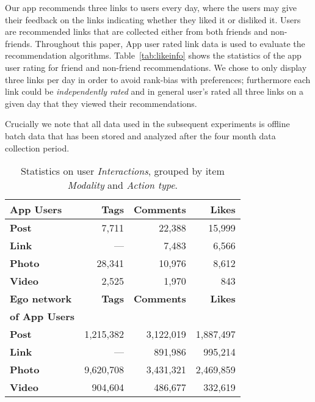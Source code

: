 Our app recommends three links to users every day, where the users may give
their feedback on the links indicating whether they liked it or
disliked it. Users are recommended links that are collected either
from both friends and non-friends. Throughout this paper, App user rated
link data is used to evaluate the recommendation algorithms.
Table~\ref{tab:likeinfo} shows the statistics of the app user rating
for friend and non-friend recommendations.  We chose to only display
three links per day in order to avoid rank-bias with preferences;
furthermore each link could be \emph{independently rated} and in general
user's rated all three links on a given day that they viewed their
recommendations.

Crucially we note that all data used in the subsequent experiments
is offline batch data that has been stored and analyzed after the four month
data collection period.  
      							

\begin{table}
\centering
\begin{tabular}{|>{\small}l|>{\small}r|>{\small}r|>{\small}r|}
\hline
\textbf{App Users} & \textbf{Tags} & \textbf{Comments} & \textbf{Likes} \\
\hline
\textbf{Post} & 7,711 & 22,388 & 15,999 \\
\hline
\textbf{Link}  & --- & 7,483 & 6,566 \\
\hline
\textbf{Photo} & 28,341 & 10,976 & 8,612 \\
\hline
\textbf{Video} & 2,525 & 1,970 & 843 \\
\hline
\hline
\textbf{Ego network} & \textbf{Tags} & \textbf{Comments} & \textbf{Likes} \\
\textbf{of App Users}  & & & \\
\hline
\textbf{Post} & 1,215,382 & 3,122,019 & 1,887,497 \\
\hline
\textbf{Link} & --- & 891,986 & 995,214 \\
\hline
\textbf{Photo} & 9,620,708 & 3,431,321 & 2,469,859 \\
\hline
\textbf{Video} & 904,604 & 486,677 & 332,619 \\
\hline
\end{tabular}
\caption{Statistics on user {\em Interactions}, grouped by item {\em Modality} and {\em Action type}.}
\label{tab:interactions}
\end{table}


